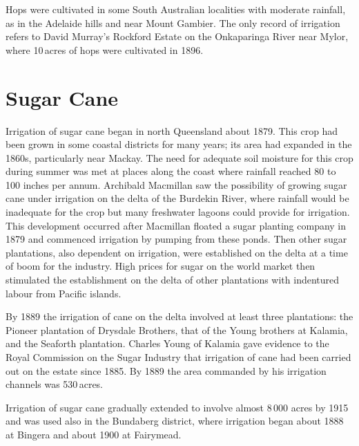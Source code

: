 Hops were cultivated in some South Australian localities with moderate
rainfall, as in the Adelaide hills and near Mount Gambier.  The only record of irrigation refers to David Murray's
Rockford Estate on the Onkaparinga River 
near Mylor,  where 10\,acres of hops were cultivated
in 1896.

\section*{Sugar Cane} 

Irrigation of sugar cane began in north Queensland about 1879.  This
crop had been grown in some coastal districts for many years; its area
had expanded in the 1860s, particularly near Mackay.  The need for adequate soil moisture for this crop during summer
was met at places along the coast where rainfall reached 80 to 100
inches per annum.  Archibald Macmillan  saw the
possibility of growing sugar cane under irrigation on the delta of the
Burdekin River,  where rainfall would be
inadequate for the crop but many freshwater lagoons could provide for
irrigation.  This development occurred after Macmillan floated a sugar
planting company in 1879 and commenced irrigation by pumping from
these ponds.  Then other sugar plantations, also dependent on
irrigation, were established on the delta at a time of boom for the
industry.  High prices for sugar on the world market then stimulated
the establishment on the delta of other plantations with indentured
labour from Pacific islands.

By 1889 the irrigation of cane on the delta involved at least three
plantations: the Pioneer plantation of Drysdale Brothers,
 that of the
Young brothers at Kalamia,  and the Seaforth
plantation.  Charles Young  of Kalamia gave evidence
to the Royal Commission on the Sugar Industry that irrigation of cane
had been carried out on the estate since 1885. By 1889 the area
commanded by his irrigation channels was 530\,acres.

Irrigation of sugar cane gradually extended to involve almost 8\,000
acres by 1915 and was used also in the Bundaberg
 district, where
irrigation began about 1888 at Bingera  and about
1900 at Fairymead.

